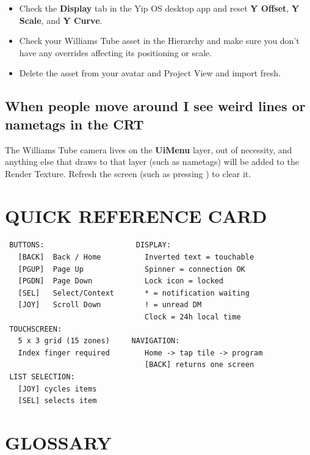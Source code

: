 \documentclass[10pt]{article}
\newcommand{\key}[1]{\fbox{\texttt{\footnotesize #1}}}
\begin{document}
\begin{itemize}[leftmargin=2em, nosep]
  \item Check the \textbf{Display} tab in the Yip OS desktop app and reset \textbf{Y Offset}, \textbf{Y Scale}, and \textbf{Y Curve}.
  \item Check your Williams Tube asset in the Hierarchy and make sure you don't have any overrides affecting its positioning or scale.
  \item Delete the asset from your avatar and Project View and import fresh.
\end{itemize}

\subsection{When people move around I see weird lines or nametags in the CRT}

The Williams Tube camera lives on the \textbf{UiMenu} layer, out of necessity, and anything else that draws to that layer (such as nametags) will be added to the Render Texture. Refresh the screen (such as pressing \key{BACK}) to clear it.

\newpage
\appendix

\section{QUICK REFERENCE CARD}
\label{sec:quickref}

\begin{screenbox}[title={\color{crtgreen}CONTROLS SUMMARY}]
\begin{verbatim}
 BUTTONS:                     DISPLAY:
   [BACK]  Back / Home          Inverted text = touchable
   [PGUP]  Page Up              Spinner = connection OK
   [PGDN]  Page Down            Lock icon = locked
   [SEL]   Select/Context       * = notification waiting
   [JOY]   Scroll Down          ! = unread DM
                                Clock = 24h local time
 TOUCHSCREEN:
   5 x 3 grid (15 zones)     NAVIGATION:
   Index finger required        Home -> tap tile -> program
                                [BACK] returns one screen
 LIST SELECTION:
   [JOY] cycles items
   [SEL] selects item
\end{verbatim}
\end{screenbox}

\section{GLOSSARY}
\label{sec:glossary}
\end{document}
